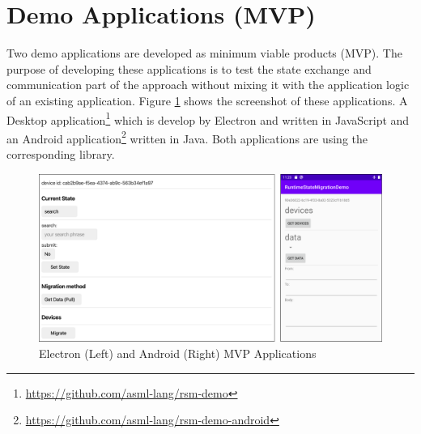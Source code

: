 \section{Demo Applications (MVP)}
Two demo applications are developed as minimum viable products (MVP). The purpose of developing these applications is to test the state exchange and communication part of the approach without mixing it with the application logic of an existing application. Figure \ref{fig:mvp} shows the screenshot of these applications. A Desktop application\footnote{\url{https://github.com/asml-lang/rsm-demo}} which is develop by Electron and written in JavaScript and an Android application\footnote{\url{https://github.com/asml-lang/rsm-demo-android}} written in Java. Both applications are using the corresponding library.

\FloatBarrier
\begin{figure}[H]
    \includegraphics[width=\linewidth]{../figures/mvp.png}
    \centering
    \caption{Electron (Left) and Android (Right) MVP Applications}
    \label{fig:mvp}
\end{figure}
\FloatBarrier

% 

